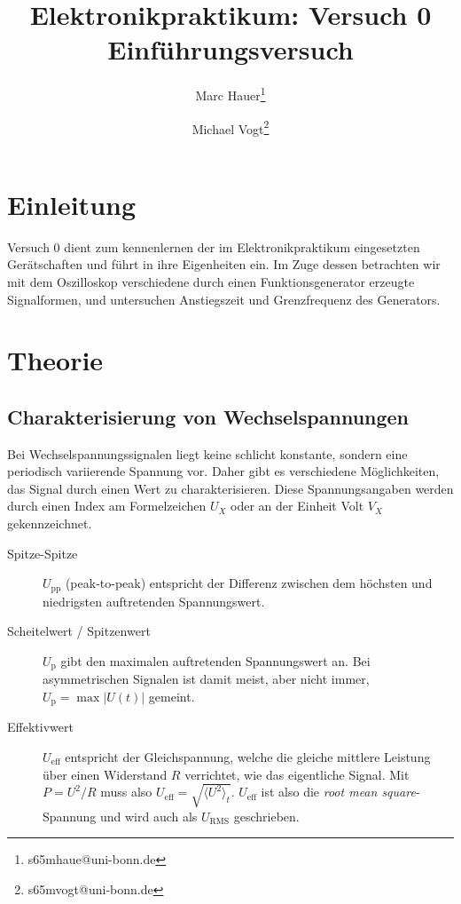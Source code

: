 \documentclass{article}
\title{Elektronikpraktikum: Versuch 0 \\ Einführungsversuch}
\author[1]{Marc Hauer\thanks{s65mhaue@uni-bonn.de}}
\author[1]{Michael Vogt\thanks{s65mvogt@uni-bonn.de}}
\affil[1]{Uni Bonn}
\begin{document}
\maketitle
\tableofcontents
\newpage
{}

\pagestyle{fancy}
\fancyhead[R]{\thepage}
\fancyhead[L]{\leftmark}


\section*{Einleitung}
Versuch 0 dient zum kennenlernen der im Elektronikpraktikum eingesetzten Gerätschaften und führt in ihre Eigenheiten ein.
Im Zuge dessen betrachten wir mit dem Oszilloskop verschiedene durch einen Funktionsgenerator erzeugte Signalformen,
und untersuchen Anstiegszeit und Grenzfrequenz des Generators.

\section{Theorie}
\subsection{Charakterisierung von Wechselspannungen}
Bei Wechselspannungssignalen liegt keine schlicht konstante, sondern eine periodisch variierende Spannung vor.
Daher gibt es verschiedene Möglichkeiten, das Signal durch einen Wert zu charakterisieren.
Diese Spannungsangaben werden durch einen Index am Formelzeichen $U_X$ oder an der Einheit Volt $V_X$ gekennzeichnet.
\begin{description} 
  \item[Spitze-Spitze] $U_\mathrm{pp}$ (peak-to-peak) entspricht der Differenz zwischen
  dem höchsten und niedrigsten auftretenden Spannungswert.
  \item[Scheitelwert / Spitzenwert] $U_\mathrm{p}$ gibt den maximalen auftretenden Spannungswert an. Bei asymmetrischen Signalen
  ist damit meist, aber nicht immer, $U_\mathrm{p} = \max{\lvert U(t) \rvert}$ gemeint.
  \item[Effektivwert] $U_\mathrm{eff}$ entspricht der Gleichspannung, welche die gleiche mittlere Leistung über einen Widerstand
  $R$ verrichtet, wie das eigentliche Signal. Mit $P=U^2/R$ muss also $U_\mathrm{eff} = \sqrt{\langle U^2 \rangle_t}$.
  $U_\mathrm{eff}$ ist also die \textit{root mean square}-Spannung und wird auch als $U_\mathrm{RMS}$ geschrieben.
\end{description} 
\end{document}
